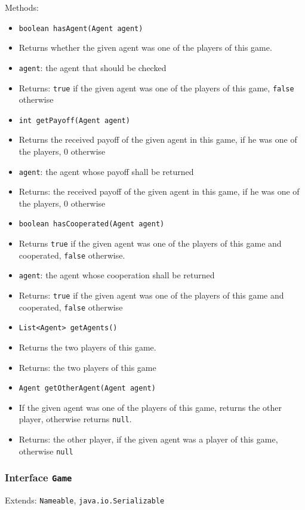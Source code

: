 \documentclass[parskip=full,11pt]{scrartcl}
\begin{document}
Methods:
\begin{itemize}\itemsep -10pt
\item  \texttt{boolean hasAgent(Agent agent)}
\item[] Returns whether the given agent was one of the players of this game.
\item[] \texttt{agent}: the agent that should be checked
\item[] Returns: \texttt{true} if the given agent was one of the players of this game, \texttt{false} otherwise

\item \texttt{int getPayoff(Agent agent)}
\item[] Returns the received payoff of the given agent in this game, if he was one of the players, \(0\) otherwise
\item[] \texttt{agent}: the agent whose payoff shall be returned
\item[] Returns: the received payoff of the given agent in this game, if he was one of the players, \(0\) otherwise

\item \texttt{boolean hasCooperated(Agent agent)}
\item[] Returns \texttt{true} if the given agent was one of the players of this game and cooperated, \texttt{false} otherwise.
\item[] \texttt{agent}: the agent whose cooperation shall be returned
\item[] Returns: \texttt{true} if the given agent was one of the players of this game and cooperated, \texttt{false} otherwise

\item \texttt{List<Agent> getAgents()}
\item[] Returns the two players of this game.
\item[] Returns: the two players of this game

\item \texttt{Agent getOtherAgent(Agent agent)}
\item[] If the given agent was one of the players of this game, returns the other player, otherwise returns \texttt{null}.
\item[] Returns: the other player, if the given agent was a player of this game, otherwise \texttt{null}
\end{itemize}

\subsubsection{Interface \texttt{Game}}
Extends: \texttt{Nameable}, \texttt{java.io.Serializable}
\end{document}
